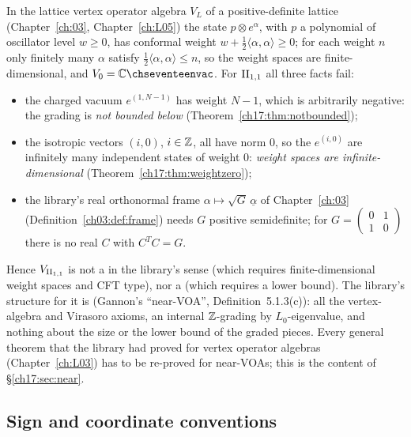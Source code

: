 In the lattice vertex operator algebra $V_L$ of a positive-definite lattice (Chapter~\ref{ch:03},
Chapter~\ref{ch:L05}) the state $p\otimes e^\alpha$, with $p$ a polynomial of oscillator level $w\ge0$,
has conformal weight $w+\tfrac12\langle\alpha,\alpha\rangle\ge0$; for each weight $n$ only finitely many
$\alpha$ satisfy $\tfrac12\langle\alpha,\alpha\rangle\le n$, so the weight spaces are finite-dimensional, and
$V_0=\C\chseventeenvac$.  For ${\mathrm{II}_{1,1}}$ all three facts fail:
\begin{itemize}
\item the charged vacuum $e^{(1,N-1)}$ has weight $N-1$, which is arbitrarily negative: the grading is
  \emph{not bounded below} (Theorem~\ref{ch17:thm:notbounded});
\item the isotropic vectors $(i,0)$, $i\in{\mathbb{Z}}$, all have norm $0$, so the $e^{(i,0)}$ are infinitely many
  independent states of weight $0$: \emph{weight spaces are infinite-dimensional}
  (Theorem~\ref{ch17:thm:weightzero});
\item the library's real orthonormal frame $\alpha\mapsto\sqrt G\,\underline\alpha$ of Chapter~\ref{ch:03}
  (Definition~\ref{ch03:def:frame}) needs $G$ positive semidefinite; for $G=\left(\begin{smallmatrix}0&1\\1&0\end{smallmatrix}\right)$
  there is no real $C$ with $C^TC=G$.
\end{itemize}
Hence ${V_{\mathrm{II}_{1,1}}}$ is not a  in the library's sense (which requires
finite-dimensional weight spaces and CFT type), nor a  (which requires a
lower bound).  The library's structure for it is  (Gannon's ``near-VOA'', Definition~5.1.3(c)):
all the vertex-algebra and Virasoro axioms, an internal ${\mathbb{Z}}$-grading by $L_0$-eigenvalue, and nothing about
the size or the lower bound of the graded pieces.  Every general theorem that the library had proved for
vertex operator algebras (Chapter~\ref{ch:L03}) has to be re-proved for near-VOAs; this is the content of
\S\ref{ch17:sec:near}.

\subsection{Sign and coordinate conventions}\label{ch17:sec:conventions}

